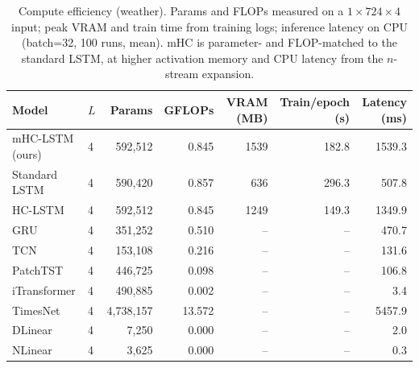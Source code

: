 \begin{table}[t]
\centering
\caption{Compute efficiency (weather). Params and FLOPs measured on a $1{\times}724{\times}4$ input; peak VRAM and train time from training logs; inference latency on CPU (batch=32, 100 runs, mean). mHC is parameter- and FLOP-matched to the standard LSTM, at higher activation memory and CPU latency from the $n$-stream expansion.}
\label{tab:efficiency}
\footnotesize
\begin{tabular}{llrrrrr}
\toprule
Model & $L$ & Params & GFLOPs & VRAM (MB) & Train/epoch (s) & Latency (ms) \\
\midrule
mHC-LSTM (ours) & 4 & 592,512 & 0.845 & 1539 & 182.8 & 1539.3 \\
Standard LSTM & 4 & 590,420 & 0.857 & 636 & 296.3 & 507.8 \\
HC-LSTM & 4 & 592,512 & 0.845 & 1249 & 149.3 & 1349.9 \\
GRU & 4 & 351,252 & 0.510 & -- & -- & 470.7 \\
TCN & 4 & 153,108 & 0.216 & -- & -- & 131.6 \\
PatchTST & 4 & 446,725 & 0.098 & -- & -- & 106.8 \\
iTransformer & 4 & 490,885 & 0.002 & -- & -- & 3.4 \\
TimesNet & 4 & 4,738,157 & 13.572 & -- & -- & 5457.9 \\
DLinear & 4 & 7,250 & 0.000 & -- & -- & 2.0 \\
NLinear & 4 & 3,625 & 0.000 & -- & -- & 0.3 \\
\bottomrule
\end{tabular}
\end{table}
